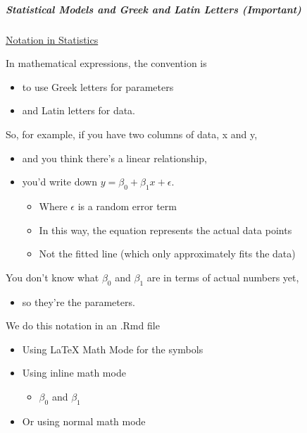 \documentclass[]{article}
\providecommand{\tightlist}{%
  \setlength{\itemsep}{0pt}\setlength{\parskip}{0pt}}
\let\oldsubparagraph\subparagraph
\renewcommand{\subparagraph}[1]{\oldsubparagraph{#1}\mbox{}}
\begin{document}
\subparagraph{Statistical Models and Greek and Latin Letters
(Important)}\label{statistical-models-and-greek-and-latin-letters-important}

\href{https://en.wikipedia.org/wiki/Notation_in_probability_and_statistics\#Statistics}{Notation
in Statistics}

In mathematical expressions, the convention is

\begin{itemize}
\tightlist
\item
  to use Greek letters for parameters
\item
  and Latin letters for data.
\end{itemize}

So, for example, if you have two columns of data, x and y,

\begin{itemize}
\tightlist
\item
  and you think there's a linear relationship,
\item
  you'd write down \(y=\beta_0 + \beta_1x + \epsilon\).

  \begin{itemize}
  \tightlist
  \item
    Where \(\epsilon\) is a random error term
  \item
    In this way, the equation represents the actual data points
  \item
    Not the fitted line (which only approximately fits the data)
  \end{itemize}
\end{itemize}

You don't know what \(\beta_0\) and \(\beta_1\) are in terms of actual
numbers yet,

\begin{itemize}
\tightlist
\item
  so they're the parameters.
\end{itemize}

We do this notation in an .Rmd file

\begin{itemize}
\tightlist
\item
  Using LaTeX Math Mode for the symbols
\item
  Using inline math mode

  \begin{itemize}
  \tightlist
  \item
    \(\beta_0\) and \(\beta_1\)
  \end{itemize}
\item
  Or using normal math mode
\end{itemize}
\end{document}
